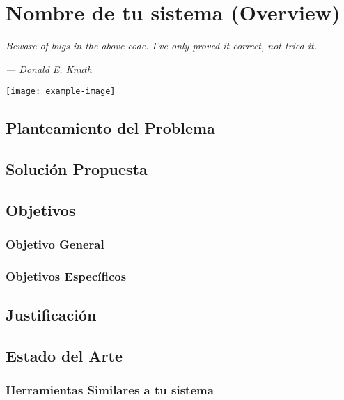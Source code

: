 \chapter{Nombre de tu sistema (Overview)}
\epigraph{\textit{Beware of bugs in the above code. I've only proved it correct, not tried it.     
	}}{\textit{—  Donald E. Knuth}}
	\vspace*{8cm}
	\begin{center}
		\centering %
		\texttt{[image: example-image]}
	\end{center}
	\thispagestyle{empty}
	\newpage
	\vspace*{2cm}
\section{Planteamiento del Problema}
\blindmathpaper

\section{Solución Propuesta}
\blindmathpaper 

\section{Objetivos}
\subsection{Objetivo General}
\blindtext[1]

\subsection{Objetivos Específicos}
\blindenumerate[15]


\section{Justificación}
\blindenumerate[10]
\blindtext[1]
\blindmathpaper


\section{Estado del Arte}

\blindtext[2]


\subsection{Herramientas Similares a tu sistema}
